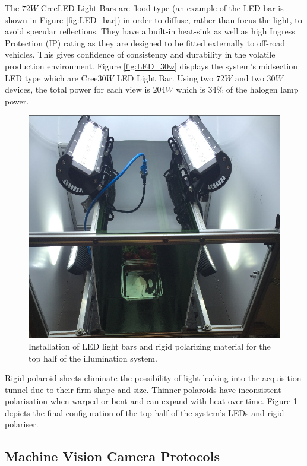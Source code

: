 \documentclass[fleqn,twoside,12pt]{report}
\begin{document}
The $72W$ Cree\textregistered LED Light Bars are flood type (an example of the LED bar is shown in Figure \ref{fig:LED_bar}) in order to diffuse, rather than focus the light, to avoid specular reflections. They have a built-in heat-sink as well as high Ingress Protection (IP) rating as they are designed to be fitted externally to off-road vehicles. This gives confidence of consistency and durability in the volatile production environment. Figure \ref{fig:LED_30w} displays the system's midsection LED type which are Cree\textregistered $30W$ LED Light Bar. Using two $72W$ and two $30W$ devices, the total power for each view is $204W$ which is $34\%$ of the halogen lamp power.



\begin{figure}[h]
	\centering
	\includegraphics[width=0.75\linewidth]{bench_led_rigid_2.png}
	\caption{Installation of LED light bars and rigid polarizing material for the top half of the illumination system.}
	\label{fig:bench_led_rigid}
\end{figure}%

Rigid polaroid sheets eliminate the possibility of light leaking into the acquisition tunnel due to their firm shape and size. Thinner polaroids have inconsistent polarisation when warped or bent and can expand with heat over time. Figure \ref{fig:bench_led_rigid} depicts the final configuration of the top half of the system's LEDs and rigid polariser.



\subsection{Machine Vision Camera Protocols}
\end{document}
